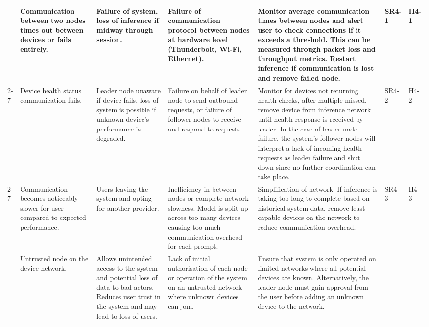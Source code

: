 \documentclass{article}
\begin{document}
\begin{landscape}
\begin{longtable}{|p{}|p{}|p{}|p{}|p{}|p{}|p{}|}
%
  & Communication between two nodes times out between devices or fails entirely.
  & Failure of system, loss of inference if midway through session.
  & Failure of communication protocol between nodes at hardware level (Thunderbolt, Wi-Fi, Ethernet).
  & Monitor average communication times between nodes and alert user to check connections if it exceeds a threshold. This can be measured through packet loss and throughput metrics. Restart inference if communication is lost and remove failed node.
  & SR4-1
  & H4-1 \\ \cline{2-7}
  & Device health status communication fails.
  & Leader node unaware if device fails, loss of system is possible if unknown device's performance is degraded.
  & Failure on behalf of leader node to send outbound requests, or failure of follower nodes to receive and respond to requests.
  & Monitor for devices not returning health checks, after multiple missed, remove device from inference network until health response is received by leader. In the case of leader node failure, the system's follower nodes will interpret a 
  lack of incoming health requests as leader failure and shut down since no further coordination can take place.
  & SR4-2
  & H4-2 \\ \cline{2-7}
\multirow{-3}{\dimexpr0.2\textwidth\relax}{General Communication}
  & Communication becomes noticeably slower for user compared to expected performance.
  & Users leaving the system and opting for another provider.
  & Inefficiency in between nodes or complete network slowness. Model is split up across too many devices causing too much communication overhead for each prompt.
  & Simplification of network. If inference is taking too long to complete based on historical system data, remove least capable devices on the network to reduce communication overhead.
  & SR4-3
  & H4-3 \\ \hline
%
%
  & Untrusted node on the device network.
  & Allows unintended access to the system and potential loss of data to bad actors. Reduces user trust in the system and may lead to loss of users.
  & Lack of initial authorisation of each node or operation of the system on an untrusted network where unknown devices can join. 
  & Ensure that system is only operated on limited networks where all potential devices are known. Alternatively, the leader node must gain approval from the user before adding an unknown device to the network.

\end{longtable}
\end{landscape}
\end{document}
